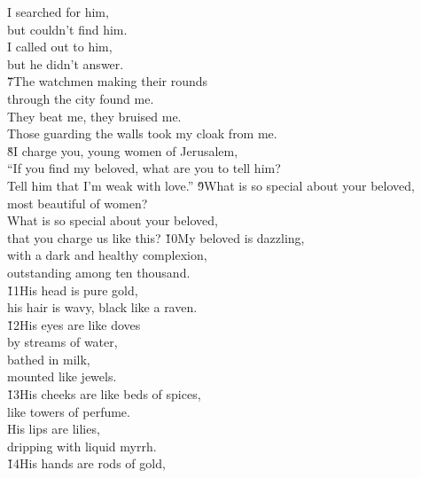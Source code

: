 \begin{poetry}
\poemll    I searched for him, \\
\poemlll       but couldn't find him. \\
\poemll    I called out to him, \\
\poemlll       but he didn't answer. \\
\poeml \v{7}The watchmen making their rounds \\
\poemll    through the city found me. \\
\poeml They beat me, they bruised me. \\
\poemll    Those guarding the walls took my cloak from me. \\
\poeml \v{8}I charge you, young women of Jerusalem, \\
\poemll    ``If you find my beloved, what are you to tell him? \\
\poemlll       Tell him that I'm weak with love.''
\poeml \v{9}What is so special about your beloved, \\
\poemll    most beautiful of women? \\
\poeml What is so special about your beloved, \\
\poemll    that you charge us like this?
\poeml \v{10}My beloved is dazzling, \\
\poemll    with a dark and healthy complexion, \\
\poemlll       outstanding among ten thousand. \\
\poeml \v{11}His head is pure gold, \\
\poemll    his hair is wavy, black like a raven. \\
\poeml \v{12}His eyes are like doves \\
\poemll    by streams of water, \\
\poeml bathed in milk, \\
\poemll    mounted like jewels. \\
\poeml \v{13}His cheeks are like beds of spices, \\
\poemll    like towers of perfume. \\
\poeml His lips are lilies, \\
\poemll    dripping with liquid myrrh. \\
\poeml \v{14}His hands are rods of gold, \\

\end{poetry}
